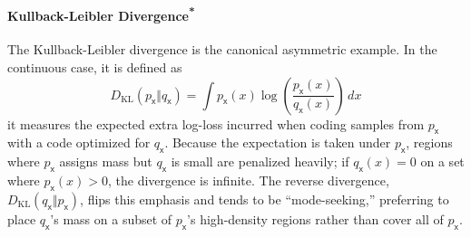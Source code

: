 \paragraph*{\texorpdfstring{Kullback-Leibler Divergence\textsuperscript{*}}{Kullback-Leibler Divergence}} The Kullback-Leibler divergence is the canonical asymmetric example. In the continuous case, it is defined as
\begin{equation}
    D_{\mathrm{KL}}(p_{\mathsf{x}}\Vert q_{\mathsf{x}})=\int p_{\mathsf{x}}(x)\log\!\left(\frac{p_{\mathsf{x}}(x)}{q_{\mathsf{x}}(x)}\right)\,dx
\end{equation}
it measures the expected extra log-loss incurred when coding samples from $p_{\mathsf{x}}$ with a code optimized for $q_{\mathsf{x}}$. Because the expectation is taken under $p_{\mathsf{x}}$, regions where $p_{\mathsf{x}}$ assigns mass but $q_{\mathsf{x}}$ is small are penalized heavily; if $q_{\mathsf{x}}(x)=0$ on a set where $p_{\mathsf{x}}(x)>0$, the divergence is infinite. The reverse divergence, $D_{\mathrm{KL}}(q_{\mathsf{x}}\Vert p_{\mathsf{x}})$, flips this emphasis and tends to be “mode-seeking,” preferring to place $q_{\mathsf{x}}$'s mass on a subset of $p_{\mathsf{x}}$'s high-density regions rather than cover all of $p_{\mathsf{x}}$.


